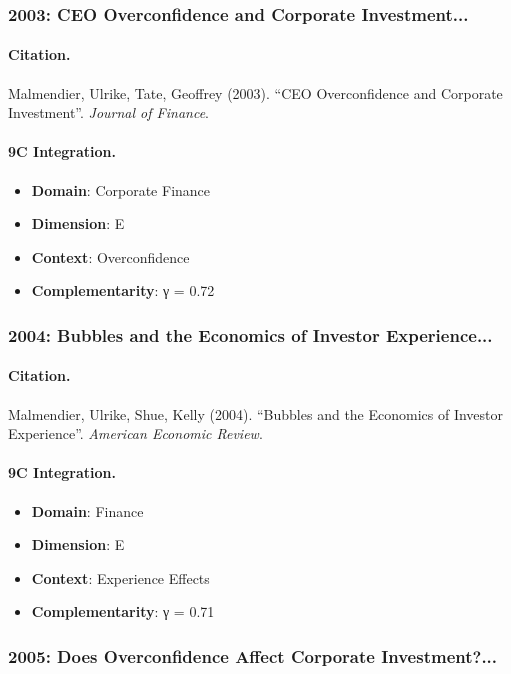 \subsubsection{2003: CEO Overconfidence and Corporate Investment...}

\paragraph{Citation.}
Malmendier, Ulrike, Tate, Geoffrey (2003). ``CEO Overconfidence and Corporate Investment''. \textit{Journal of Finance}.

\paragraph{9C Integration.}
\begin{itemize}[nosep]
  \item \textbf{Domain}: Corporate Finance
  \item \textbf{Dimension}: E
  \item \textbf{Context}: Overconfidence
  \item \textbf{Complementarity}: γ = 0.72
\end{itemize}


\subsubsection{2004: Bubbles and the Economics of Investor Experience...}

\paragraph{Citation.}
Malmendier, Ulrike, Shue, Kelly (2004). ``Bubbles and the Economics of Investor Experience''. \textit{American Economic Review}.

\paragraph{9C Integration.}
\begin{itemize}[nosep]
  \item \textbf{Domain}: Finance
  \item \textbf{Dimension}: E
  \item \textbf{Context}: Experience Effects
  \item \textbf{Complementarity}: γ = 0.71
\end{itemize}


\subsubsection{2005: Does Overconfidence Affect Corporate Investment?...}

